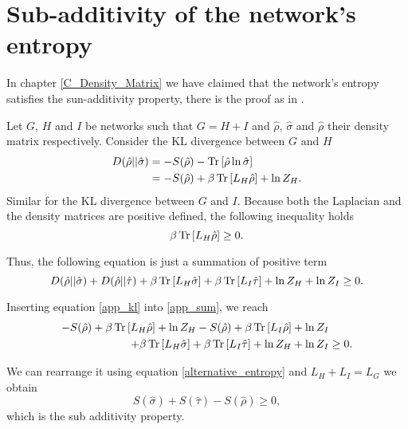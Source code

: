 \chapter{Sub-additivity of the network's entropy}\label{C_sub_additivity}
In chapter \ref{C_Density_Matrix} we have claimed that the network's entropy satisfies the sun-additivity property, there is the proof as in \cite{De_Domenico_2016}.

Let $G$, $H$ and $I$ be networks such that $G = H+ I$ and $\hat\rho$, $\hat\sigma$ and $\hat\rho$ their density matrix respectively. 
Consider the KL divergence between $G$ and $H$
\begin{equation}\label{app_kl}
    \begin{aligned}
            D(\hat\rho||\hat\sigma) &= - S(\hat\rho)- \operatorname{Tr}\left[\hat\rho\ln\hat\sigma\right] \\
            &= - S(\hat\rho)+ \beta\operatorname{Tr}\left[L_H\hat\rho\right] + \ln Z_H .
    \end{aligned}
\end{equation}
Similar for the KL divergence between $G$ and $I$. Because both the Laplacian and the density matrices are positive defined, the following inequality holds
\begin{equation}
    \beta\operatorname{Tr}\left[L_H\hat\rho\right]  \geq 0.
\end{equation}

Thus, the following equation is just a summation of positive term
\begin{equation}\label{app_sum}
    D(\hat\rho||\hat\sigma)+D(\hat\rho||\hat\tau) +\beta\operatorname{Tr}\left[L_H\hat\sigma\right] +\beta\operatorname{Tr}\left[L_I\hat\tau\right] +\ln Z_H +\ln Z_I\geq 0.
\end{equation} 

Inserting equation \eqref{app_kl} into \eqref{app_sum}, we reach
\begin{equation}
    \begin{split}
        - S(\hat\rho)+ \beta\operatorname{Tr}\left[L_H\hat\rho\right] + \ln Z_H - S(\hat\rho) +\beta\operatorname{Tr}\left[L_I\hat\rho\right] + \ln Z_I& \\
        +\beta\operatorname{Tr}\left[L_H\hat\sigma\right] +\beta\operatorname{Tr}\left[L_I\hat\tau\right] +\ln Z_H +\ln Z_I&\geq 0.
    \end{split}
\end{equation}

We can rearrange it using equation \eqref{alternative_entropy} and $L_H + L_I = L_G$ we obtain
\begin{equation}
    S(\hat\sigma) + S(\hat\tau) -  S(\hat\rho)\geq 0,
\end{equation}
which is the sub additivity property.